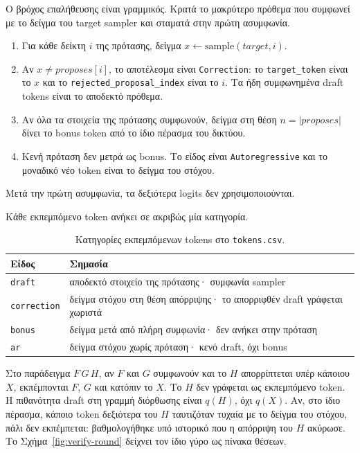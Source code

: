 \documentclass[a4paper,12pt]{report}
\theoremstyle{plain}
\theoremstyle{definition}
\theoremstyle{remark}
\begin{document}
Ο βρόχος επαλήθευσης είναι γραμμικός. Κρατά το μακρύτερο πρόθεμα που συμφωνεί
με το δείγμα του target sampler και σταματά στην πρώτη ασυμφωνία.

\begin{enumerate}[leftmargin=*]
  \item Για κάθε δείκτη \(i\) της πρότασης, δείγμα
    \(x \leftarrow \mathrm{sample}(\textit{target}, i)\).
  \item Αν \(x \neq \textit{proposes}[i]\), το αποτέλεσμα είναι
    \texttt{Correction}: το \texttt{target\_token} είναι το \(x\) και το
    \texttt{rejected\_proposal\_index} είναι το \(i\). Τα ήδη συμφωνημένα
    draft tokens είναι το αποδεκτό πρόθεμα.
  \item Αν όλα τα στοιχεία της πρότασης συμφωνούν, δείγμα στη θέση
    \(n = |\textit{proposes}|\) δίνει το bonus token από το ίδιο πέρασμα του
    δικτύου.
  \item Κενή πρόταση δεν μετρά ως bonus. Το είδος είναι
    \texttt{Autoregressive} και το μοναδικό νέο token είναι το δείγμα του
    στόχου.
\end{enumerate}

Μετά την πρώτη ασυμφωνία, τα δεξιότερα logits δεν χρησιμοποιούνται.

Κάθε εκπεμπόμενο token ανήκει σε ακριβώς μία κατηγορία.

\begin{table}[ht]
  \centering
  \caption{Κατηγορίες εκπεμπόμενων tokens στο \texttt{tokens.csv}.}
  \label{tab:kinds}
  \small
  \begin{tabular}{@{}lp{9.4cm}@{}}
    \toprule
    Είδος               & Σημασία                                            \\
    \midrule
    \texttt{draft}      & αποδεκτό στοιχείο της πρότασης· συμφωνία sampler   \\
    \texttt{correction} & δείγμα στόχου στη θέση απόρριψης· το
    απορριφθέν draft γράφεται χωριστά                                        \\
    \texttt{bonus}      & δείγμα μετά από πλήρη συμφωνία· δεν ανήκει
    στην πρόταση                                                             \\
    \texttt{ar}         & δείγμα στόχου χωρίς πρόταση· κενό draft, όχι bonus \\
    \bottomrule
  \end{tabular}
\end{table}

Στο παράδειγμα \(F\,G\,H\), αν \(F\) και \(G\) συμφωνούν και το \(H\)
απορρίπτεται υπέρ κάποιου \(X\), εκπέμπονται \(F\), \(G\) και κατόπιν το
\(X\). Το \(H\) δεν γράφεται ως εκπεμπόμενο token. Η πιθανότητα draft στη
γραμμή διόρθωσης είναι \(q(H)\), όχι \(q(X)\). Αν, στο ίδιο πέρασμα, κάποιο
token δεξιότερα του \(H\) ταυτιζόταν τυχαία με το δείγμα του στόχου, πάλι δεν
εκπέμπεται: βαθμολογήθηκε υπό ιστορικό που η απόρριψη του \(H\) ακύρωσε. Το
Σχήμα~\ref{fig:verify-round} δείχνει τον ίδιο γύρο ως πίνακα θέσεων.
\end{document}
